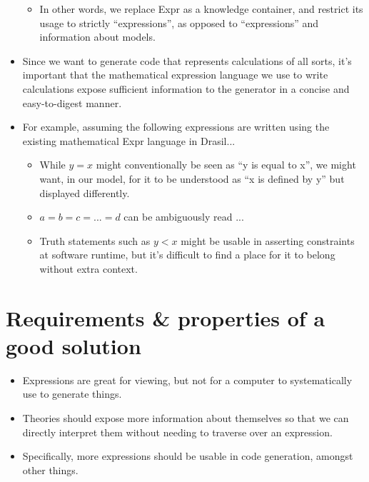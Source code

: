 \begin{itemize}
\begin{itemize}
		      \item In other words, we replace Expr as a knowledge container,
		            and restrict its usage to strictly ``expressions'', as
		            opposed to ``expressions'' and information about models.

	      \end{itemize}

	\item Since we want to generate code that represents calculations of all
	      sorts, it's important that the mathematical expression language we use
	      to write calculations expose sufficient information to the generator
	      in a concise and easy-to-digest manner.

	\item For example, assuming the following expressions are written using the
	      existing mathematical Expr language in Drasil...
	      \begin{itemize}

		      \item While \(y = x\) might conventionally be seen as ``y is equal
		            to x'', we might want, in our model, for it to be understood
		            as ``x is defined by y'' but displayed differently.

		      \item \(a = b = c = ... = d\) can be ambiguously read ...

		      \item Truth statements such as \(y < x\) might be usable in
		            asserting constraints at software runtime, but it's
		            difficult to find a place for it to belong without extra
		            context.

	      \end{itemize}

\end{itemize}

\section{Requirements \& properties of a good solution}

\begin{itemize}

	\item Expressions are great for viewing, but not for a computer to
	      systematically use to generate things.

	\item Theories should expose more information about themselves so that we
	      can directly interpret them without needing to traverse over an
	      expression.

	\item Specifically, more expressions should be usable in code generation,
	      amongst other things.

\end{itemize}

